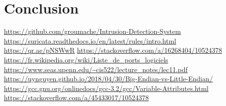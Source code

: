 \documentclass[a4paper]{article}
\begin{document}










\section{Conclusion}


















\newpage \tableofcontents \listoffigures
\begin{thebibliography}{9}
 {\small \url{https://github.com/groumache/Intrusion-Detection-System}}
 {\small \url{https://suricata.readthedocs.io/en/latest/rules/intro.html}}
 {\small \url{https://qr.ae/pNSWwR}}
 {\small \url{https://stackoverflow.com/a/16268404/10524378}}
 {\small \url{https://fr.wikipedia.org/wiki/Liste_de_ports_logiciels}}
 {\small \url{https://www.seas.upenn.edu/~cis522/lecture_notes/lec11.pdf}}
 {\small \url{https://uynguyen.github.io/2018/04/30/Big-Endian-vs-Little-Endian/}}
 {\small \url{https://gcc.gnu.org/onlinedocs/gcc-3.2/gcc/Variable-Attributes.html}}
 {\small \url{https://stackoverflow.com/a/45433017/10524378}}
\end{thebibliography}
\end{document}
